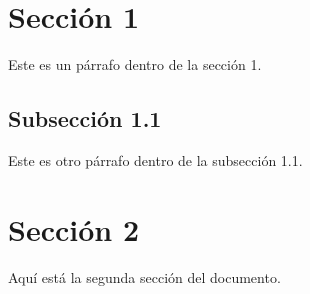 \documentclass{article}
\begin{document}
\section{Sección 1}
Este es un párrafo dentro de la sección 1.

\subsection{Subsección 1.1}
Este es otro párrafo dentro de la subsección 1.1.

\section{Sección 2}
Aquí está la segunda sección del documento.
\end{document}
